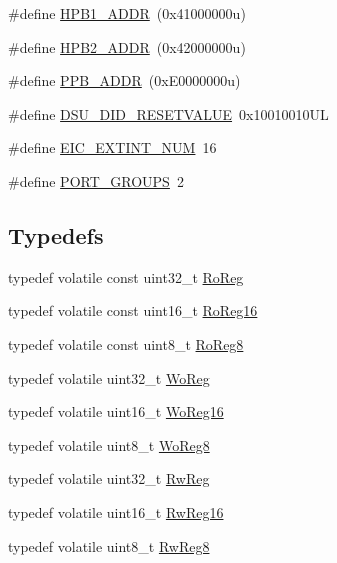 \begin{DoxyCompactItemize}
\#define \mbox{\hyperlink{group___s_a_m_d21_g17_a_u__definitions_gabdae009c8fef488e4248183ffa937535}{H\+P\+B1\+\_\+\+A\+D\+DR}}~(0x41000000u)
\item 
\#define \mbox{\hyperlink{group___s_a_m_d21_g17_a_u__definitions_gaef42fa53ddf169a2a50be70d29f73571}{H\+P\+B2\+\_\+\+A\+D\+DR}}~(0x42000000u)
\item 
\#define \mbox{\hyperlink{group___s_a_m_d21_g17_a_u__definitions_ga8895d0a3a9a3126cc44330f86c8ce564}{P\+P\+B\+\_\+\+A\+D\+DR}}~(0x\+E0000000u)
\item 
\#define \mbox{\hyperlink{group___s_a_m_d21_g17_a_u__definitions_gada75131d542c9e1966238f5488f89bd6}{D\+S\+U\+\_\+\+D\+I\+D\+\_\+\+R\+E\+S\+E\+T\+V\+A\+L\+UE}}~0x10010010\+UL
\item 
\#define \mbox{\hyperlink{group___s_a_m_d21_g17_a_u__definitions_ga88ebc38c95506296f5d21f82476296ae}{E\+I\+C\+\_\+\+E\+X\+T\+I\+N\+T\+\_\+\+N\+UM}}~16
\item 
\#define \mbox{\hyperlink{group___s_a_m_d21_g17_a_u__definitions_gab9243ffe03a1dc631b57a495b4b3d467}{P\+O\+R\+T\+\_\+\+G\+R\+O\+U\+PS}}~2
\end{DoxyCompactItemize}
\subsection*{Typedefs}
\begin{DoxyCompactItemize}
\item 
typedef volatile const uint32\+\_\+t \mbox{\hyperlink{group___s_a_m_d21_g17_a_u__definitions_ga5d556f8391af4141be23f7334ac9dd68}{Ro\+Reg}}
\item 
typedef volatile const uint16\+\_\+t \mbox{\hyperlink{group___s_a_m_d21_g17_a_u__definitions_gaebf6e33c2d49a802e06e22a95ea9d0d0}{Ro\+Reg16}}
\item 
typedef volatile const uint8\+\_\+t \mbox{\hyperlink{group___s_a_m_d21_g17_a_u__definitions_ga0d957f1433aaf5d70e4dc2b68288442d}{Ro\+Reg8}}
\item 
typedef volatile uint32\+\_\+t \mbox{\hyperlink{group___s_a_m_d21_g17_a_u__definitions_gac0f96d4e8018367b38f527007cf0eafd}{Wo\+Reg}}
\item 
typedef volatile uint16\+\_\+t \mbox{\hyperlink{group___s_a_m_d21_g17_a_u__definitions_ga0ab0e5f6c8301aa1c2068e511d854094}{Wo\+Reg16}}
\item 
typedef volatile uint8\+\_\+t \mbox{\hyperlink{group___s_a_m_d21_g17_a_u__definitions_ga5e336e5a36ee12ebeafb021108e5275b}{Wo\+Reg8}}
\item 
typedef volatile uint32\+\_\+t \mbox{\hyperlink{group___s_a_m_d21_g17_a_u__definitions_gacf1496e3bbe303e55f627fc7558a68c7}{Rw\+Reg}}
\item 
typedef volatile uint16\+\_\+t \mbox{\hyperlink{group___s_a_m_d21_g17_a_u__definitions_gacce07556c80fc352ae607f225f19fed5}{Rw\+Reg16}}
\item 
typedef volatile uint8\+\_\+t \mbox{\hyperlink{group___s_a_m_d21_g17_a_u__definitions_gae361754be775bb192f85821d3ab33c17}{Rw\+Reg8}}
\end{DoxyCompactItemize}



